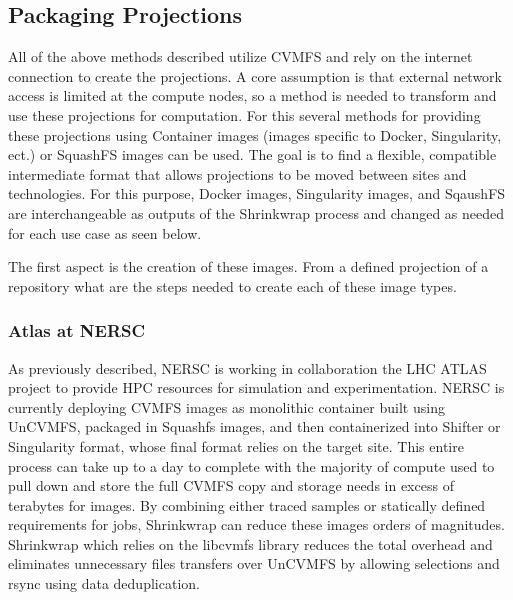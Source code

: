 \documentclass[sigconf]{acmart}
\begin{document}
\subsection{Packaging Projections}

All of the above methods described utilize CVMFS
and rely on the internet connection to create
the projections.
A core assumption is that external network
access is limited at the compute nodes, so a method
is needed to transform and use these projections
for computation.
For this several methods for providing
these projections using 
Container images (images specific to Docker, Singularity, ect.)
or SquashFS images can be used.
The goal is to find a flexible, compatible intermediate
format that allows projections to be moved between sites
and technologies.
For this purpose, Docker images, Singularity images, and 
SqaushFS are interchangeable as outputs of the Shrinkwrap process
and changed as needed for each use case as seen below.


The first aspect is the creation of these images.
From a defined projection of a repository
what are the steps needed to create each of these image types.

\subsubsection{Atlas at NERSC}

As previously described, NERSC is working in collaboration the LHC ATLAS project
to provide HPC resources for simulation and experimentation.
NERSC is currently deploying CVMFS images as monolithic container 
built using UnCVMFS, packaged in Squashfs images, and then containerized 
into Shifter or Singularity format, whose final format
relies on the target site.
This entire process can take up to a day to complete with the majority
of compute used to pull down and store the full CVMFS copy and storage
needs in excess of terabytes for images.
By combining either traced samples or statically defined requirements for 
jobs, Shrinkwrap can reduce these images orders of magnitudes.
Shrinkwrap which relies on the libcvmfs library reduces 
the total overhead and eliminates unnecessary files transfers
over UnCVMFS by allowing selections and rsync using data deduplication.
\end{document}
